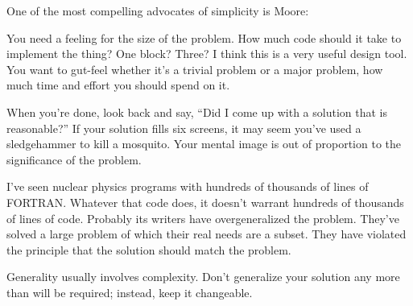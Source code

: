 \bigskip\blackline{2ex}
\noindent One of the most compelling advocates of simplicity is Moore:

\begin{tfquot}
\noindent You need a feeling for the size of the problem. How much code should it
take to implement the thing? One block? Three? I think this is a very useful
design tool. You want to gut-feel whether it's a trivial problem or a major
problem, how much time and effort you should spend on it.

When you're done, look back and say, ``Did I come up with a solution that is
reasonable?'' If your solution fills six screens, it may seem you've used a
sledgehammer to kill a mosquito. Your mental image is out of proportion to
the significance of the problem.

I've seen nuclear physics programs with hundreds of thousands of lines of
FORTRAN. Whatever that code does, it doesn't warrant hundreds of
thousands of lines of code. Probably its writers have overgeneralized the
problem. They've solved a large problem of which their real needs are a
subset. They have violated the principle that the solution should match the
problem.
\end{tfquot}
\blackline{1ex}

\begin{tip}
Generality usually involves complexity. Don't generalize your solution any
more than will be required; instead, keep it changeable.
\end{tip}

